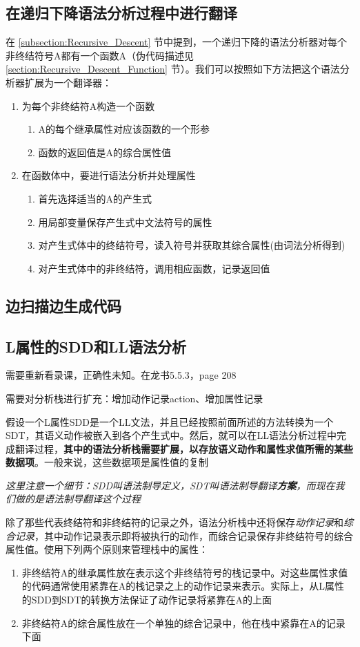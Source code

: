 \documentclass[]{report}
\begin{document}
		\subsection{在递归下降语法分析过程中进行翻译}
		在 \ref{subsection:Recursive_Descent} 节中提到，一个递归下降的语法分析器对每个非终结符号A都有一个函数A（伪代码描述见 \ref{section:Recursive_Descent_Function} 节）。我们可以按照如下方法把这个语法分析器扩展为一个翻译器：
		\begin{enumerate}
			\item 为每个非终结符A构造一个函数
			\begin{enumerate}
				\item A的每个继承属性对应该函数的一个形参
				\item 函数的返回值是A的综合属性值
			\end{enumerate}
			\item 在函数体中，要进行语法分析并处理属性
			\begin{enumerate}
				\item 首先选择适当的A的产生式
				\item 用局部变量保存产生式中文法符号的属性
				\item 对产生式体中的终结符号，读入符号并获取其综合属性(由词法分析得到)
				\item 对产生式体中的非终结符，调用相应函数，记录返回值
			\end{enumerate}
		\end{enumerate}
		\subsection{边扫描边生成代码}
		\subsection{L属性的SDD和LL语法分析}
		{\color[HTML]{ff0000}需要重新看录课，正确性未知。在龙书5.5.3，page 208}\par
		需要对分析栈进行扩充：增加动作记录action、增加属性记录\par
		假设一个L属性SDD是一个LL文法，并且已经按照前面所述的方法转换为一个SDT，其语义动作被嵌入到各个产生式中。然后，就可以在LL语法分析过程中完成翻译过程，\textbf{其中的语法分析栈需要扩展，以存放语义动作和属性求值所需的某些数据项}。一般来说，这些数据项是属性值的复制\par
		\textit{这里注意一个细节：SDD叫语法制导定义，SDT叫语法制导翻译\textbf{方案}，而现在我们做的是语法制导翻译这个过程}\par
		除了那些代表终结符和非终结符的记录之外，语法分析栈中还将保存\textit{动作记录}和\textit{综合记录}，其中动作记录表示即将被执行的动作，而综合记录保存非终结符号的综合属性值。使用下列两个原则来管理栈中的属性：
		\begin{enumerate}
			\item 非终结符A的继承属性放在表示这个非终结符号的栈记录中。对这些属性求值的代码通常使用紧靠在A的栈记录之上的动作记录来表示。实际上，从L属性的SDD到SDT的转换方法保证了动作记录将紧靠在A的上面
			\item 非终结符A的综合属性放在一个单独的综合记录中，他在栈中紧靠在A的记录下面
		\end{enumerate}
\end{document}
